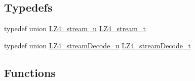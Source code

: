 \subsection*{Typedefs}
\begin{DoxyCompactItemize}
\item 
typedef union \hyperlink{union_l_z4__stream__u}{L\+Z4\+\_\+stream\+\_\+u} \hyperlink{compat-lz4_8h_a4fb9ac4ce6d5e25edc9188f9d6633498}{L\+Z4\+\_\+stream\+\_\+t}
\item 
typedef union \hyperlink{union_l_z4__stream_decode__u}{L\+Z4\+\_\+stream\+Decode\+\_\+u} \hyperlink{compat-lz4_8h_a76a1eaa4729efddb43040217daad4d4e}{L\+Z4\+\_\+stream\+Decode\+\_\+t}
\end{DoxyCompactItemize}
\subsection*{Functions}
